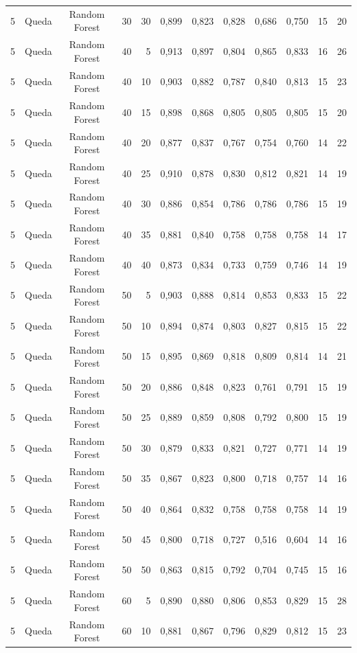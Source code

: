 \begin{longtable}{ccclrrrrrrrr}
5 & Queda & Random Forest & 30 & 30 & 0,899 & 0,823 & 0,828 & 0,686 & 0,750 & 15 & 20 \\
5 & Queda & Random Forest & 40 & 5 & 0,913 & 0,897 & 0,804 & 0,865 & 0,833 & 16 & 26 \\
5 & Queda & Random Forest & 40 & 10 & 0,903 & 0,882 & 0,787 & 0,840 & 0,813 & 15 & 23 \\
5 & Queda & Random Forest & 40 & 15 & 0,898 & 0,868 & 0,805 & 0,805 & 0,805 & 15 & 20 \\
5 & Queda & Random Forest & 40 & 20 & 0,877 & 0,837 & 0,767 & 0,754 & 0,760 & 14 & 22 \\
5 & Queda & Random Forest & 40 & 25 & 0,910 & 0,878 & 0,830 & 0,812 & 0,821 & 14 & 19 \\
5 & Queda & Random Forest & 40 & 30 & 0,886 & 0,854 & 0,786 & 0,786 & 0,786 & 15 & 19 \\
5 & Queda & Random Forest & 40 & 35 & 0,881 & 0,840 & 0,758 & 0,758 & 0,758 & 14 & 17 \\
5 & Queda & Random Forest & 40 & 40 & 0,873 & 0,834 & 0,733 & 0,759 & 0,746 & 14 & 19 \\
5 & Queda & Random Forest & 50 & 5 & 0,903 & 0,888 & 0,814 & 0,853 & 0,833 & 15 & 22 \\
5 & Queda & Random Forest & 50 & 10 & 0,894 & 0,874 & 0,803 & 0,827 & 0,815 & 15 & 22 \\
5 & Queda & Random Forest & 50 & 15 & 0,895 & 0,869 & 0,818 & 0,809 & 0,814 & 14 & 21 \\
5 & Queda & Random Forest & 50 & 20 & 0,886 & 0,848 & 0,823 & 0,761 & 0,791 & 15 & 19 \\
5 & Queda & Random Forest & 50 & 25 & 0,889 & 0,859 & 0,808 & 0,792 & 0,800 & 15 & 19 \\
5 & Queda & Random Forest & 50 & 30 & 0,879 & 0,833 & 0,821 & 0,727 & 0,771 & 14 & 19 \\
5 & Queda & Random Forest & 50 & 35 & 0,867 & 0,823 & 0,800 & 0,718 & 0,757 & 14 & 16 \\
5 & Queda & Random Forest & 50 & 40 & 0,864 & 0,832 & 0,758 & 0,758 & 0,758 & 14 & 19 \\
5 & Queda & Random Forest & 50 & 45 & 0,800 & 0,718 & 0,727 & 0,516 & 0,604 & 14 & 16 \\
5 & Queda & Random Forest & 50 & 50 & 0,863 & 0,815 & 0,792 & 0,704 & 0,745 & 15 & 16 \\
5 & Queda & Random Forest & 60 & 5 & 0,890 & 0,880 & 0,806 & 0,853 & 0,829 & 15 & 28 \\
5 & Queda & Random Forest & 60 & 10 & 0,881 & 0,867 & 0,796 & 0,829 & 0,812 & 15 & 23 \\

\end{longtable}
